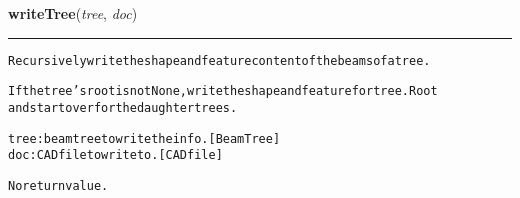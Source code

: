     \label{theia:rendering:writer:writeTree}

    \vspace{0.5ex}

\hspace{.8\funcindent}\begin{boxedminipage}{\funcwidth}

    \raggedright \textbf{writeTree}(\textit{tree}, \textit{doc})

    \vspace{-1.5ex}

    \rule{\textwidth}{0.5\fboxrule}
\setlength{\parskip}{2ex}
\begin{alltt}
Recursively write the shape and feature content of the beams of a tree.

If the tree's root is not None, write the shape and feature for tree.Root
    and start over for the daughter trees.

tree: beamtree to write the info. [BeamTree]
doc: CAD file to write to. [CAD file]

No return value.
\end{alltt}

\setlength{\parskip}{1ex}
    \end{boxedminipage}

